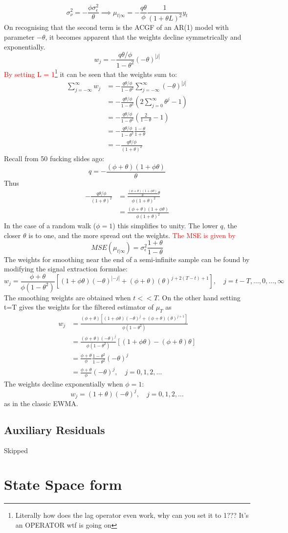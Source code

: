 \documentclass[DIV=14,titlepage=false]{scrreprt}
\begin{document}
\[
\sigma^2_\nu = -\frac{\phi \sigma^2_\epsilon}{\theta} \implies \mu_{t|\infty} = -\frac{q \theta}{\phi} \frac{1}{(1+\theta L)^2} y_t
\]
On recognising that the second term is the ACGF of an AR(1) model with parameter $-\theta$, it becomes apparent that the weights decline symmetrically and exponentially. 
\[
    w_j = -\frac{q \theta / \phi}{1-\theta^2} (-\theta)^{|j|}
\]
\textcolor{red}{By setting L = 1}\footnote{Literally how does the lag operator even work, why can you set it to 1??? It's an OPERATOR wtf is going on} it can be seen that the weights sum to:
\begin{align*}
    \sum_{j=-\infty}^\infty w_j &= -\frac{q \theta / \phi}{1-\theta^2} \sum_{j=-\infty}^\infty (-\theta)^{|j|}\\
    &= -\frac{q \theta / \phi}{1-\theta^2} \left( 2 \sum_{j=0}^\infty \theta^j - 1 \right)\\
    &= -\frac{q \theta / \phi}{1-\theta^2} \left( \frac{2}{1-\theta} - 1 \right)\\
    &= -\frac{q \theta / \phi}{1-\theta^2} \frac{1-\theta}{1+\theta}\\
    &= -\frac{q \theta / \phi}{(1+\theta)^2}
\end{align*}
Recall from 50 fucking slides ago:
\[
    q = -\frac{(\phi + \theta)(1+\phi \theta)}{\theta}
\]
Thus
\begin{align*}
    -\frac{q \theta / \phi}{(1+\theta)^2} &= \frac{\frac{(\phi + \theta)(1+\phi \theta)}{\theta}\theta}{\phi(1+\theta)^2}\\
    &= \frac{(\phi+\theta)(1+\phi\theta)}{\phi(1+\theta)^2}
\end{align*}
In the case of a random walk ($\phi = 1$) this simplifies to unity. The lower $q$, the closer $\theta$ is to one, and the more spread out the weights. \textcolor{red}{The MSE is given by}
\[
    MSE(\mu_{t|\infty}) = \sigma^2_\epsilon \frac{1+\theta}{1-\theta}
\]
The weights for smoothing near the end of a semi-infinite sample can be found by modifying the signal extraction formulae:
\[
    w_j = \frac{\phi + \theta}{\phi(1-\theta^2)}[(1+\phi\theta)(-\theta)^{|-j|}+(\phi+\theta)(\theta)^{j+2(T-t)+1}], \quad j=t-T,\dots, 0, \dots, \infty
\]
The smoothing weights are obtained when $t<<T$. On the other hand setting t=T gives the weights for the filtered estimator of $\mu_T$ as
\begin{align*}
    w_j &= \frac{(\phi+\theta)[(1+\phi\theta)(-\theta)^j + (\phi+\theta)(\theta)^{j+1}]}{\phi(1-\theta^2)}\\
    &= \frac{(\phi+\theta)(-\theta)^j}{\phi(1-\theta^2)}[(1+\phi\theta) - (\phi+\theta)\theta]\\
    &= \frac{\phi+\theta}{\phi}\frac{1-\theta^2}{1-\theta^2}(-\theta)^j\\
    &= \frac{\phi+\theta}{\phi}(-\theta)^j, \quad j=0,1,2,\dots
\end{align*}
The weights decline exponentially when $\phi =1$:
\[
    w_j = (1+\theta)(-\theta)^j, \quad j=0,1,2,\dots
\]
as in the classic EWMA.
\subsection{Auxiliary Residuals}
Skipped
\section{State Space form}
\end{document}

